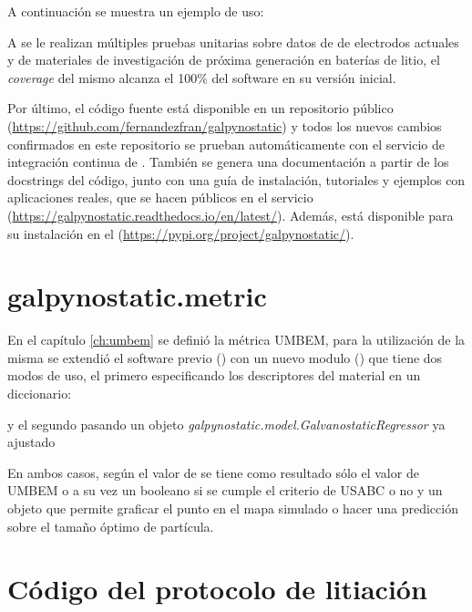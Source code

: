 A continuación se muestra un ejemplo de uso:



A  se le realizan múltiples pruebas unitarias sobre datos de
de electrodos actuales y de materiales de investigación de próxima generación en 
baterías de litio, el \textit{coverage} del mismo alcanza el 100\% del software
en su versión inicial.

Por último, el código fuente está disponible en un repositorio público 
(\url{https://github.com/fernandezfran/galpynostatic}) y todos los nuevos cambios 
confirmados en este repositorio se prueban automáticamente con el servicio de 
integración continua de  . También se genera una documentación a 
partir de los docstrings del código, junto con una guía de instalación,
tutoriales y ejemplos con aplicaciones reales, que se hacen públicos en el 
servicio  (\url{https://galpynostatic.readthedocs.io/en/latest/}). 
Además,  está disponible para su instalación en el 
 (\url{https://pypi.org/project/galpynostatic/}).


\section{galpynostatic.metric}\label{software:metric}

En el capítulo \ref{ch:umbem} se definió la métrica UMBEM, para la utilización de 
la misma se extendió el software previo () con un nuevo 
modulo () que tiene dos modos de uso, el primero especificando 
los descriptores del material en un diccionario:

y el segundo pasando un objeto \textit{galpynostatic.model.GalvanostaticRegressor}
ya ajustado

En ambos casos, según el valor de  se tiene como resultado
sólo el valor de UMBEM o a su vez un booleano si se cumple el criterio de USABC 
o no y un objeto que permite graficar el punto en el mapa simulado o hacer una
predicción sobre el tamaño óptimo de partícula.


\section{Código del protocolo de litiación}\label{software:lithiationprotocol}

